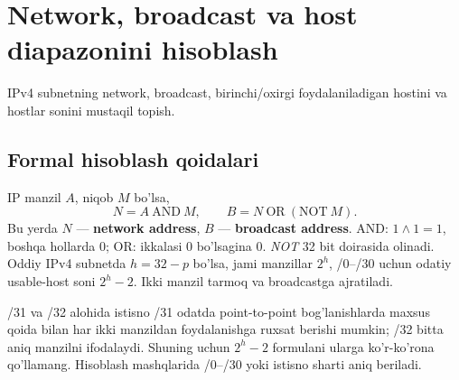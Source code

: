 \documentclass[11pt,a4paper,oneside]{book}
\newcommand{\kw}[1]{\textbf{\color{Deep}#1}}
\begin{document}
\chapter{Network, broadcast va host diapazonini hisoblash}
\begin{goal}IPv4 subnetning network, broadcast, birinchi/oxirgi foydalaniladigan hostini va hostlar sonini mustaqil topish.\end{goal}
\section{Formal hisoblash qoidalari}
IP manzil $A$, niqob $M$ bo'lsa,
\[\boxed{N=A\ \mathrm{AND}\ M},\qquad\boxed{B=N\ \mathrm{OR}\ (\mathrm{NOT}\ M)}.\]
Bu yerda $N$ — \kw{network address}, $B$ — \kw{broadcast address}. AND: $1\land 1=1$, boshqa hollarda 0; OR: ikkalasi 0 bo'lsagina 0. \emph{NOT} 32 bit doirasida olinadi. Oddiy IPv4 subnetda $h=32-p$ bo'lsa, jami manzillar $2^h$, /0--/30 uchun odatiy usable-host soni $2^h-2$. Ikki manzil tarmoq va broadcastga ajratiladi.
\begin{caution}{/31 va /32 alohida istisno}
/31 odatda point-to-point bog'lanishlarda maxsus qoida bilan har ikki manzildan foydalanishga ruxsat berishi mumkin; /32 bitta aniq manzilni ifodalaydi. Shuning uchun $2^h-2$ formulani ularga ko'r-ko'rona qo'llamang. Hisoblash mashqlarida /0--/30 yoki istisno sharti aniq beriladi.
\end{caution}
\end{document}
